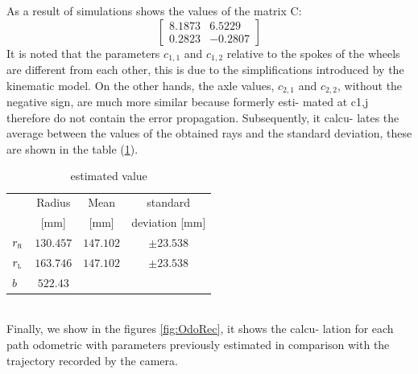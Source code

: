 As a result of simulations shows the values of the matrix C:
\begin{equation}
\label{eq:Cresult}
	\begin{bmatrix}
		8.1873  &  6.5229\\
    	0.2823 &  -0.2807
	\end{bmatrix}
\end{equation}
It is noted that the parameters $c_ {1,1}$ and $c_ {1,2}$ relative to the spokes of the wheels are different from each other, this is due to the simplifications introduced by the kinematic model. On the other hands, the axle values, $c_ {2,1}$ and $c_ {2,2}$, without the negative sign, are much more similar because formerly esti- mated at c1,j therefore do not contain the error propagation. Subsequently, it calcu- lates the average between the values of the obtained rays and the standard deviation, these are shown in the table (\ref{tab:recapvalue}).
\begin{table}[!h]
\centering
	\begin{tabular}{lccc}
		\hline
								& Radius 	& Mean 	& standard  \\
								&	[mm]	& [mm]	& deviation [mm]\\
		\hline
		$r_\textsc{r}$	&	$130.457$		& $147.102	$		&	$\pm23.538$\\
		$r_\textsc{l}$	&	$163.746$		& $147.102	$		&	$\pm23.538$\\
		$b$					&	$522.43$\\
		\hline
\end{tabular}
\caption{estimated value}
\label{tab:recapvalue}
\end{table}
\\Finally, we show in the figures \ref{fig:OdoRec}, it shows the calcu- lation for each path odometric with parameters previously estimated in comparison with the trajectory recorded by the camera.
